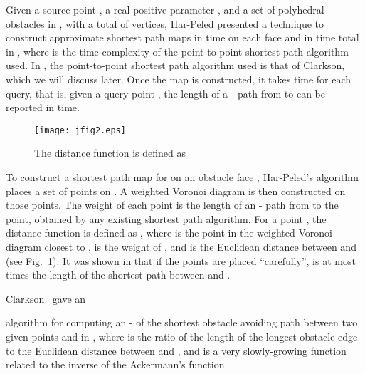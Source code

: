 \documentclass{llncs}
\begin{document}
Given a source point , a real positive parameter , and a set of polyhedral obstacles  in , with a total of  vertices,
Har-Peled \cite{Sar99} presented a technique to construct approximate shortest path maps in  time on each face and in  time total in , where  is the time complexity of the point-to-point shortest path
algorithm used. In \cite{Sar99}, the point-to-point shortest path
algorithm used is that of Clarkson\cite{Clar87}, which we will discuss later.
Once the map is constructed, it takes 
time for each query, that is, given a query point , the length of a
- path
from  to  can be reported in  time.

\begin{figure}\begin{center}
    \leavevmode
\texttt{[image: jfig2.eps]}
    \caption{The distance function  is defined as }
    \label{jfig2}
    \end{center}
\end{figure}

To construct a shortest path map for 
on an obstacle face , Har-Peled's algorithm places a set of
 points on . A weighted Voronoi
diagram is then constructed on those points.
The weight of each point is the length of an - path from  to the point,
obtained by any
existing shortest path algorithm. For a point , the distance function  is defined as
,
where  is the point in the weighted Voronoi diagram closest
to ,  is the
weight of , and  is the Euclidean distance between  and  (see Fig.~\ref{jfig2}).
It was shown in \cite{Sar99} that
if the points are placed ``carefully'',  is at most  times the length of the shortest
path between  and .


Clarkson~\cite{Clar87} gave an

algorithm for computing an - of the shortest obstacle avoiding path
between two given points  and  in
, where  is the ratio of the length of the longest obstacle edge to the
Euclidean distance between  and , and  is a very slowly-growing function related to
the inverse of the Ackermann's function.
\end{document}
